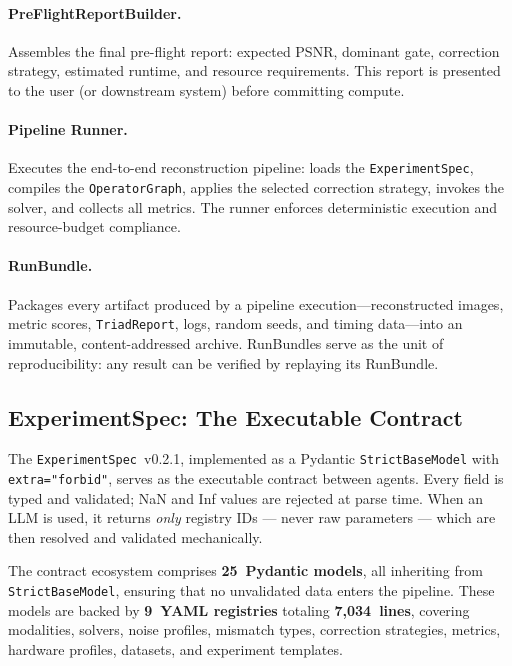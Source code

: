 \paragraph{PreFlightReportBuilder.}
Assembles the final pre-flight report: expected PSNR, dominant gate,
correction strategy, estimated runtime, and resource requirements.  This
report is presented to the user (or downstream system) before committing
compute.

\paragraph{Pipeline Runner.}
Executes the end-to-end reconstruction pipeline: loads the
\texttt{ExperimentSpec}, compiles the \texttt{OperatorGraph}, applies the
selected correction strategy, invokes the solver, and collects all
metrics.  The runner enforces deterministic execution and resource-budget
compliance.

\paragraph{RunBundle.}
Packages every artifact produced by a pipeline execution---reconstructed
images, metric scores, \texttt{TriadReport}, logs, random seeds, and
timing data---into an immutable, content-addressed archive.  RunBundles
serve as the unit of reproducibility: any result can be verified by
replaying its RunBundle.

\subsection{ExperimentSpec: The Executable Contract}

The \texttt{ExperimentSpec}~v0.2.1, implemented as a Pydantic
\texttt{StrictBaseModel} with \texttt{extra="forbid"}, serves as the
executable contract between agents.  Every field is typed and validated;
NaN and Inf values are rejected at parse time.  When an LLM is used, it
returns \emph{only} registry IDs --- never raw parameters --- which are
then resolved and validated mechanically.

The contract ecosystem comprises \textbf{25~Pydantic models}, all
inheriting from \texttt{StrictBaseModel}, ensuring that no unvalidated
data enters the pipeline.  These models are backed by \textbf{9~YAML
registries} totaling \textbf{7,034~lines}, covering modalities, solvers,
noise profiles, mismatch types, correction strategies, metrics, hardware
profiles, datasets, and experiment templates.
